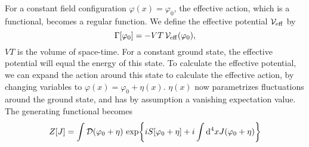 For a constant field configuration $\varphi(x) = \varphi_0$, the effective action, which is a functional, becomes a regular function.
We define the effective potential $\mathcal{V}_{\mathrm{eff}}$ by
\begin{equation}
    \label{definition effective potential}
    \Gamma[\varphi_0] = - V T \, \mathcal{V}_{\mathrm{eff}}(\varphi_0),
\end{equation}
$VT$ is the volume of space-time.
For a constant ground state, the effective potential will equal the energy of this state.
To calculate the effective potential, we can expand the action around this state to calculate the effective action,
by changing variables to $\varphi(x) = \varphi_0 + \eta(x)$.
$\eta(x)$ now parametrizes fluctuations around the ground state, and has by assumption a vanishing expectation value.
The generating functional becomes
\begin{align}
    Z[J] 
    = \int \mathcal{D} (\varphi_0 + \eta) \, 
    \exp{i S[\varphi_0 + \eta] + i \int \dd^4 x J (\varphi_0 + \eta) }
\end{align}

